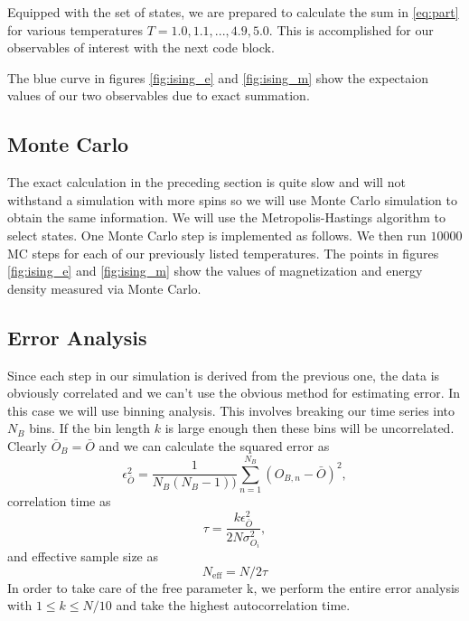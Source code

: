 Equipped with the set of states, we are prepared to calculate the sum in \ref{eq:part} for various temperatures $T = {1.0, 1.1, ..., 4.9, 5.0}$. This is accomplished for our observables of interest with the next code block.

The blue curve in figures \ref{fig:ising_e} and \ref{fig:ising_m} show the expectaion values of our two observables due to exact summation.
\subsection{Monte Carlo}
The exact calculation in the preceding section is quite slow and will not withstand a simulation with more spins so we will use Monte Carlo simulation to obtain the same information. We will use the Metropolis-Hastings algorithm to select states. One Monte Carlo step is implemented as follows.
We then run $10000$ MC steps for each of our previously listed temperatures.
The points in figures \ref{fig:ising_e} and \ref{fig:ising_m} show the values of magnetization and energy density measured via Monte Carlo.
\subsection{Error Analysis}
Since each step in our simulation is derived from the previous one, the data is obviously correlated and we can't use the obvious method for estimating error. In this case we will use binning analysis. This involves breaking our time series into $N_B$ bins. If the bin length $k$ is large enough then these bins will be uncorrelated. Clearly $\bar{O}_B = \bar{O}$ and we can calculate the squared error as
\begin{equation}
\epsilon^2_{\bar{O}} = \frac{1}{N_B(N_B-1))}\sum_{n=1}^{N_B}(O_{B,n} - \bar{O})^2,
\end{equation}
correlation time as
\begin{equation}
\tau = \frac{k \epsilon^2_{\bar{O}}}{2 N \sigma^2_{O_i}},
\end{equation}
and effective sample size as 
\begin{equation}
N_{\mathrm{eff}} = N/2\tau
\end{equation}
In order to take care of the free parameter k, we perform the entire error analysis with $1 \leq k \leq N/10$ and take the highest autocorrelation time.

